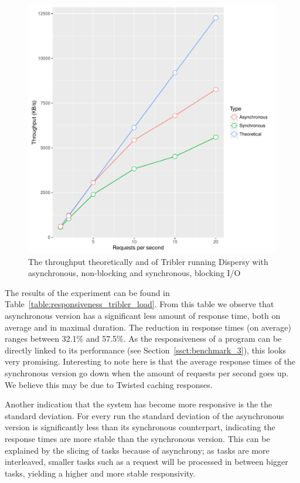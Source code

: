 \begin{figure}[!h]
	\centering
	\includegraphics[width=\linewidth]{experimentation/images/throughput_requests.pdf}
	\caption{The throughput theoretically and of Tribler running Dispersy with asynchronous, non-blocking and synchronous, blocking I/O }
	\label{fig:throughput_requests}
\end{figure} 

The results of the experiment can be found in Table~\ref{table:responsiveness_tribler_load}.
From this table we observe that asynchronous version has a significant less amount of response time, both on average and in maximal duration.
The reduction in response times (on average) ranges between 32.1\% and 57.5\%.
As the responsiveness of a program can be directly linked to its performance (see Section~\ref{ssct:benchmark_3}), this looks very promising.
Interesting to note here is that the average response times of the synchronous version go down when the amount of requests per second goes up.
We believe this may be due to Twisted caching responses.

Another indication that the system has become more responsive is the the standard deviation.
For every run the standard deviation of the asynchronous version is significantly less than its synchronous counterpart, indicating the response times are more stable than the synchronous version. 
This can be explained by the slicing of tasks because of asynchrony; as tasks are more interleaved, smaller tasks such as a request will be processed in between bigger tasks, yielding a higher and more stable responsivity.

